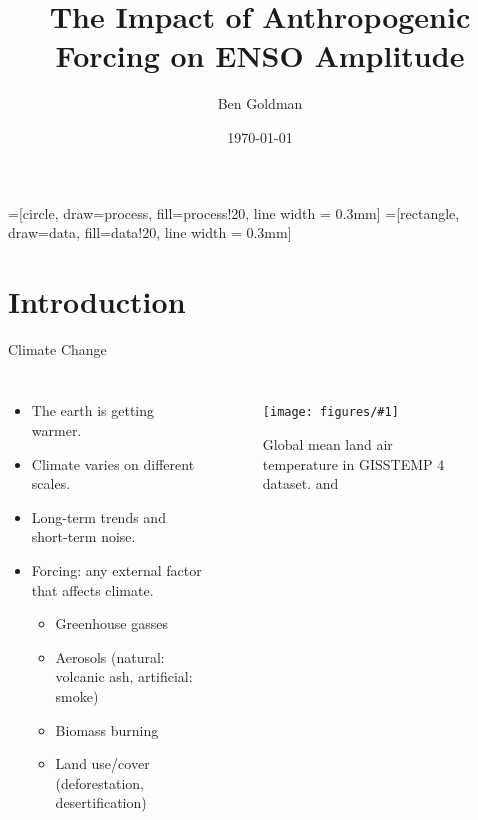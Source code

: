 \documentclass{beamer}
\title{The Impact of Anthropogenic Forcing on ENSO Amplitude}
\author{Ben Goldman}
\date{\today}
\newcommand{\myfig}[3]{
  \begin{figure}
    \centering
    \texttt{[image: figures/\#1]}
    \caption{#2}
    \label{fig:#3}
  \end{figure}
}
\begin{document}
  =[circle, draw=process, fill=process!20, line width = 0.3mm]
  =[rectangle, draw=data, fill=data!20, line width = 0.3mm]

\maketitle

\section{Introduction}

\begin{frame}{Climate Change}

  \begin{columns}
    \begin{itemize}
    \item The earth is getting warmer. \citep{pachauri2014climate}
    \item Climate varies on different scales.
    \item Long-term trends and short-term noise.
    \item \alert{Forcing}: any external factor that affects climate.
      \begin{itemize}
      \item Greenhouse gasses
      \item Aerosols (natural: volcanic ash, artificial: smoke)
      \item Biomass burning
      \item Land use/cover (deforestation, desertification)
      \end{itemize}
    \end{itemize}
    \myfig{intro_fig_3.pdf}{Global mean land air temperature in GISSTEMP 4 dataset. \citep{gistemp2019giss} and \citep{lenssen2019improvements}}{this}
  \end{columns}
\end{frame}
\end{document}
